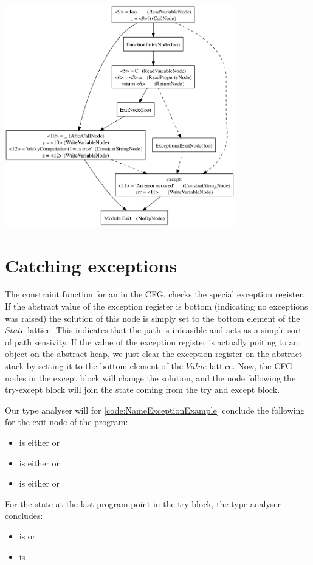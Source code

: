 \begin{listing}[H]
	\begin{center}
		\includegraphics[width=0.75\textwidth]{images/exception1.png}
	\end{center}
	\vspace{-10pt}
\end{listing}


\section{Catching exceptions}
The constraint function for an  in the CFG, checks the special exception register. If the abstract value of the exception register is bottom (indicating no exceptions was raised) the solution of this node is simply set to the bottom element of the $State$ lattice. This indicates that the path is infeasible and acts as a simple sort of path sensivity. If the value of the exception register is actually poiting to an object on the abstract heap, we just clear the exception register on the abstract stack by setting it to the bottom element of the $Value$ lattice. Now, the CFG nodes in the except block will change the solution, and the node following the try-except block will join the state coming from the try and except block.

Our type analyser will for \autoref{code:NameExceptionExample} conclude the following for the exit node of the program:

\begin{itemize}
	\item {} is either  or 
	\item {} is either  or 
	\item {} is either  or 
\end{itemize}

For the state at the last program point in the try block, the type analyser concludes:

\begin{itemize}
	\item {} is  or 
	\item {} is 
\end{itemize}